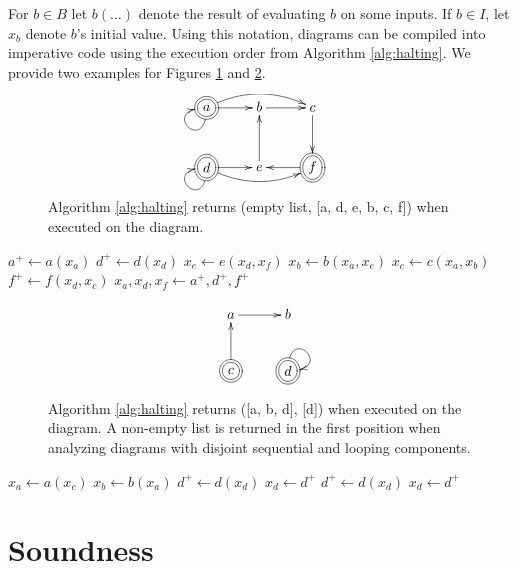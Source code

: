 \documentclass[twocolumn]{article}
\begin{document}
For $b\in B$ let $b(\dots)$ denote the result of evaluating $b$ on some inputs. If $b\in I$, let $x_b$ denote $b$'s initial value. Using this notation, diagrams can be compiled into imperative code using the execution order from Algorithm \ref{alg:halting}. We provide two examples for Figures \ref{fig:alg2example2} and \ref{fig:alg2example3}.

\begin{figure}[h]
\[
    \xymatrix{
        *++[o][F=]{a} \ar@(d, l)[] \ar@/^1em/[rr] \ar[r]  & b \ar[r] & c \ar[d] \\
        *++[o][F=]{d} \ar@(d, l)[] \ar@/_1em/[rr] \ar[r] & e \ar[u] & *++[o][F=]{f} \ar[l]
    }
\]
    \caption{Algorithm \ref{alg:halting} returns (empty list, [a, d, e, b, c, f]) when executed on the diagram.}
    \label{fig:alg2example2}
\end{figure}

\begin{algorithm}[H]
\caption{Figure \ref{fig:alg2example2} Compiled}
\begin{algorithmic}[1]
\Loop
\State $a^+ \gets a(x_a)$
\State $d^+ \gets d(x_d)$
\State $x_e \gets e(x_d,x_f)$
\State $x_b \gets b(x_a, x_e)$
\State $x_c \gets c(x_a,x_b)$
\State $f^+ \gets f(x_d, x_c)$
\State $x_a, x_d, x_f \gets a^+, d^+, f^+$
\EndLoop
\end{algorithmic}
\end{algorithm}

\begin{figure}[h]
\[
    \xymatrix{
        a \ar[r] & b \\
        *++[o][F=]{c} \ar[u] & *++[o][F=]{d} \ar@(u, r)[] \\
    }
\]
    \caption{Algorithm \ref{alg:halting} returns ([a, b, d], [d]) when executed on the diagram. A non-empty list is returned in the first position when analyzing diagrams with disjoint sequential and looping components.
    }
    \label{fig:alg2example3}
\end{figure}

\begin{algorithm}[H]
\caption{Figure \ref{fig:alg2example3} Compiled}
\begin{algorithmic}[1]
\State $x_a \gets a(x_c)$
\State $x_b \gets b(x_a)$
\State $d^+ \gets d(x_d)$
\State $x_d \gets d^+$
\Loop
\State $d^+ \gets d(x_d)$
\State $x_d \gets d^+$
\EndLoop
\end{algorithmic}
\end{algorithm}

\section{Soundness}\label{sec:soundness}
\end{document}

